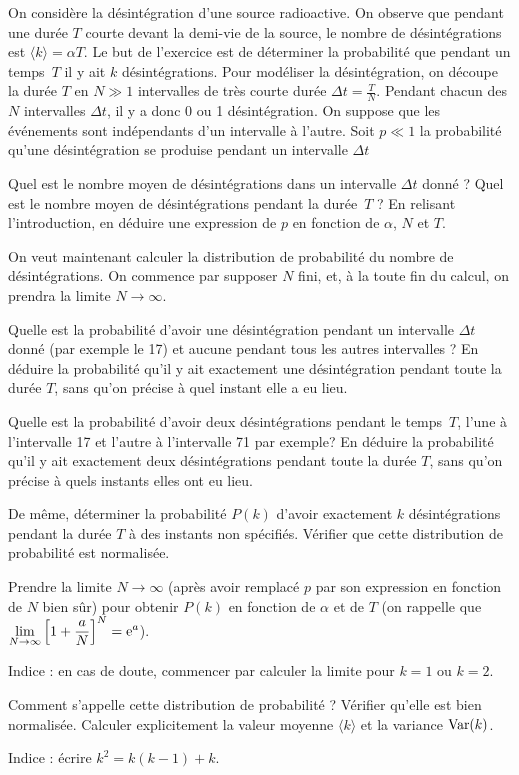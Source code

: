 On considère la désintégration d'une source radioactive. On observe que pendant une durée $T$ courte devant la demi-vie de la source, le nombre  de désintégrations est $\langle k \rangle =\alpha T$. Le but de l'exercice est de déterminer la probabilité que pendant un temps~$T$ il y ait $k$ désintégrations. Pour modéliser la désintégration, on découpe la durée $T$ en $N\gg1$ intervalles de très courte durée $\Delta t=\frac{T}{N}$. Pendant chacun des $N$ intervalles $\Delta t$, il y a donc 0 ou 1 désintégration. On suppose que les événements sont indépendants d'un intervalle à l'autre. Soit $p\ll1$ la probabilité qu'une désintégration se produise pendant un intervalle $\Delta t$

\medskip

\question
Quel est le nombre moyen de désintégrations dans un intervalle $\Delta t$ donné ?  Quel est le nombre moyen de désintégrations pendant la durée~$T$ ? En relisant l'introduction, en déduire une expression de $p$ en fonction de $\alpha$, $N$ et $T$.\label{decrad1}

\medskip

On veut maintenant calculer la distribution de probabilité du nombre de désintégrations. On commence par supposer $N$ fini, et, à la toute fin du calcul, on prendra la limite $N\to\infty$.

\question
Quelle est la probabilité d'avoir une désintégration pendant un intervalle $\Delta t$ donné (par exemple le 17) et aucune pendant tous les autres intervalles ? En déduire la probabilité qu'il y ait exactement une désintégration pendant toute la durée $T$, sans qu'on précise à quel instant elle a eu lieu.\label{decrad2}

\question
Quelle est la probabilité d'avoir deux désintégrations pendant le temps~$T$, l'une à l'intervalle 17 et l'autre à l'intervalle 71 par exemple? En déduire la probabilité qu'il y ait exactement deux désintégrations pendant toute la durée $T$, sans qu'on précise à quels instants elles ont eu lieu. \label{decrad3}

\question
De même, déterminer la probabilité $P(k)$ d'avoir exactement $k$ désintégrations pendant la durée $T$ à des instants non spécifiés. Vérifier que cette distribution de probabilité est normalisée.

\question
Prendre la limite $N\to\infty$ (après avoir remplacé $p$ par son expression en fonction de $N$ bien sûr) pour obtenir $P(k)$ en fonction de $\alpha$ et de $T$ (on rappelle que $\displaystyle \lim_{N\to\infty}\Big[1+\frac a N\Big]^N={\rm e}^a$).

Indice : en cas de doute, commencer par calculer la limite pour $k=1$ ou $k=2$.

\question
Comment s'appelle cette distribution de probabilité ? Vérifier qu'elle est bien normalisée. Calculer explicitement la valeur moyenne $\langle k\rangle$ et la variance ${\rm Var}(k)$.

Indice : écrire \mbox{$k^2=k(k-1)+k$}.
